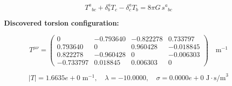 
\begin{equation}
  T^a{}_{bc} + \delta^a_b T_c - \delta^a_c T_b = 8\pi G \, s^a{}_{bc}
\end{equation}

\textbf{Discovered torsion configuration:}

\begin{equation}
  T^{\mu\nu} = \begin{pmatrix}
    0 & -0.793640 & -0.822278 & 0.733797 \\
    0.793640 & 0 & 0.960428 & -0.018845 \\
    0.822278 & -0.960428 & 0 & -0.006303 \\
    -0.733797 & 0.018845 & 0.006303 & 0
  \end{pmatrix} \quad \text{m}^{-1}
\end{equation}

\begin{equation}
  |T| = 1.6635e+0 \text{ m}^{-1}, \quad
  \lambda = -10.0000, \quad
  \sigma = 0.0000e+0 \text{ J}\cdot\text{s/m}^3
\end{equation}